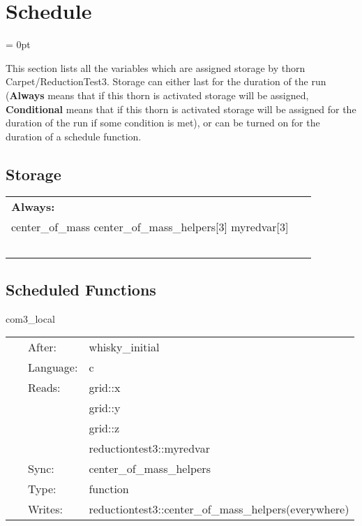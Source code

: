 
\section{Schedule} 


\parskip = 0pt


\noindent This section lists all the variables which are assigned storage by thorn Carpet/ReductionTest3.  Storage can either last for the duration of the run ({\bf Always} means that if this thorn is activated storage will be assigned, {\bf Conditional} means that if this thorn is activated storage will be assigned for the duration of the run if some condition is met), or can be turned on for the duration of a schedule function.


\subsection*{Storage}

\hspace{5mm}

 \begin{tabular*}{160mm}{ll} 

{\bf Always:}&  ~ \\ 
 center\_of\_mass center\_of\_mass\_helpers[3] myredvar[3] & ~\\ 
~ & ~\\ 
\end{tabular*} 


\subsection*{Scheduled Functions}
\vspace{5mm}


\hspace{5mm} com3\_local 

\hspace{5mm}{\it setup integrands for com calculation } 


\hspace{5mm}

 \begin{tabular*}{160mm}{cll} 
~ & After:  & whisky\_initial \\ 
~ & Language:  & c \\ 
~ & Reads:  & grid::x \\ 
~& ~ &grid::y\\ 
~& ~ &grid::z\\ 
~& ~ &reductiontest3::myredvar\\ 
~ & Sync:  & center\_of\_mass\_helpers \\ 
~ & Type:  & function \\ 
~ & Writes:  & reductiontest3::center\_of\_mass\_helpers(everywhere) \\ 
\end{tabular*} 


